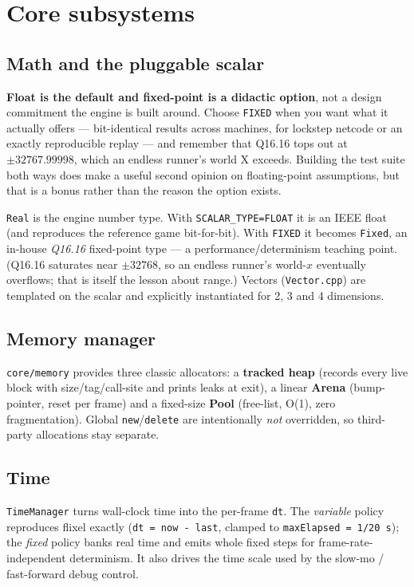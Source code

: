 \documentclass[11pt]{report}
\newcommand{\code}[1]{\texttt{#1}}
\begin{document}
\chapter{Core subsystems}
\section{Math and the pluggable scalar}
\textbf{Float is the default and fixed-point is a didactic option}, not a design
commitment the engine is built around. Choose \code{FIXED} when you want what it
actually offers --- bit-identical results across machines, for lockstep netcode
or an exactly reproducible replay --- and remember that Q16.16 tops out at
$\pm32767.99998$, which an endless runner's world X exceeds. Building the test
suite both ways does make a useful second opinion on floating-point assumptions,
but that is a bonus rather than the reason the option exists.

\code{Real} is the engine number type. With \code{SCALAR\_TYPE=FLOAT} it is an
IEEE float (and reproduces the reference game bit-for-bit). With \code{FIXED} it
becomes \code{Fixed}, an in-house \emph{Q16.16} fixed-point type --- a
performance/determinism teaching point. (Q16.16 saturates near $\pm32768$, so an
endless runner's world-$x$ eventually overflows; that is itself the lesson about
range.) Vectors (\code{Vector.cpp}) are templated on the scalar and explicitly
instantiated for 2, 3 and 4 dimensions.

\section{Memory manager}
\code{core/memory} provides three classic allocators: a \textbf{tracked heap}
(records every live block with size/tag/call-site and prints leaks at exit), a
linear \textbf{Arena} (bump-pointer, reset per frame) and a fixed-size
\textbf{Pool} (free-list, O(1), zero fragmentation). Global \code{new}/\code{delete}
are intentionally \emph{not} overridden, so third-party allocations stay separate.

\section{Time}
\code{TimeManager} turns wall-clock time into the per-frame \code{dt}. The
\emph{variable} policy reproduces flixel exactly (\code{dt = now - last}, clamped
to \code{maxElapsed = 1/20\,s}); the \emph{fixed} policy banks real time and emits
whole fixed steps for frame-rate-independent determinism. It also drives the time
scale used by the slow-mo / fast-forward debug control.
\end{document}
